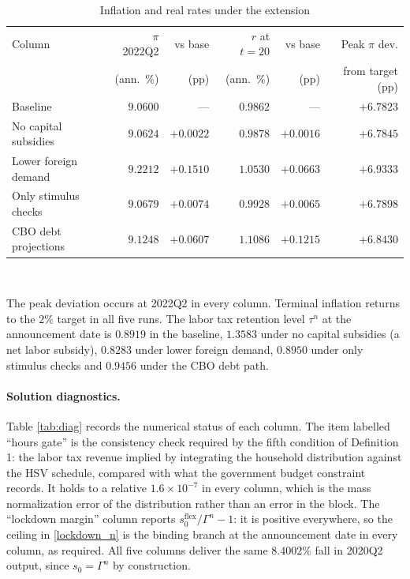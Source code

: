 \begin{table}[t]\centering
\caption{Inflation and real rates under the extension}\label{tab:extension}
\small
\begin{tabular}{lrrrrr}
\toprule
Column & $\pi$ 2022Q2 & vs base & $r$ at $t=20$ & vs base & Peak $\pi$ dev. \\
       & (ann.\ \%)   & (pp)    & (ann.\ \%)    & (pp)    & from target (pp) \\
\midrule
Baseline              & $9.0600$ & ---       & $0.9862$ & ---       & $+6.7823$ \\
No capital subsidies  & $9.0624$ & $+0.0022$ & $0.9878$ & $+0.0016$ & $+6.7845$ \\
Lower foreign demand  & $9.2212$ & $+0.1510$ & $1.0530$ & $+0.0663$ & $+6.9333$ \\
Only stimulus checks  & $9.0679$ & $+0.0074$ & $0.9928$ & $+0.0065$ & $+6.7898$ \\
CBO debt projections  & $9.1248$ & $+0.0607$ & $1.1086$ & $+0.1215$ & $+6.8430$ \\
\bottomrule
\end{tabular}
\\[0.5em]
\parbox{0.93\textwidth}{\footnotesize The peak deviation occurs at 2022Q2 in
every column. Terminal inflation returns to the $2\%$ target in all five runs.
The labor tax retention level $\tau^n$ at the announcement date is $0.8919$ in
the baseline, $1.3583$ under no capital subsidies (a net labor subsidy),
$0.8283$ under lower foreign demand, $0.8950$ under only stimulus checks and
$0.9456$ under the CBO debt path.}
\end{table}

\paragraph{Solution diagnostics.} Table \ref{tab:diag} records the numerical
status of each column. The item labelled ``hours gate'' is the consistency check
required by the fifth condition of Definition 1: the labor tax revenue implied
by integrating the household distribution against the HSV schedule, compared
with what the government budget constraint records. It holds to a relative
$1.6\times10^{-7}$ in every column, which is the mass normalization error of the
distribution rather than an error in the block. The ``lockdown margin'' column
reports $s^{\text{flex}}_0/\Gamma^n - 1$: it is positive everywhere, so the
ceiling in \eqref{lockdown_n} is the binding branch at the announcement date in
every column, as required. All five columns deliver the same $8.4002\%$ fall in
2020Q2 output, since $s_0=\Gamma^n$ by construction.

